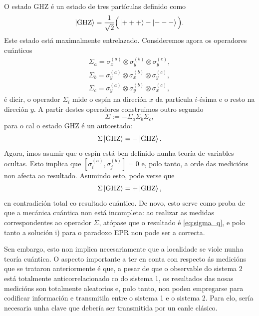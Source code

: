 \documentclass[a4paper,12pt]{article}
\begin{document}
O estado GHZ é un estado de tres partículas definido como
\begin{equation}
	\ket{\mathrm{GHZ}} = \frac{1}{\sqrt{2}} \Big ( \ket{+++} - \ket{---} \Big ).
\end{equation}
\noindent
Este estado está maximalmente entrelazado. Consideremos agora os operadores cuánticos
\begin{equation}
\begin{gathered}
		\Sigma_a = \sigma_x^{(a)} \otimes \sigma_y^{(b)} \otimes \sigma_y^{(c)}, \\
		\Sigma_b = \sigma_y^{(a)} \otimes \sigma_x^{(b)} \otimes \sigma_y^{(c)}, \\
		\Sigma_c = \sigma_y^{(a)} \otimes \sigma_y^{(b)} \otimes \sigma_x^{(c)},
\end{gathered}
\end{equation}
\noindent
é dicir, o operador $\Sigma_i$ mide o espín na direción $x$ da partícula $i$-ésima e o resto na direción $y$. A partir destes operadores construimos outro segundo
\begin{equation}
	\Sigma := -\Sigma_a \Sigma_b \Sigma_c,
\end{equation}
\noindent
para o cal o estado GHZ é un autoestado:
\begin{equation}
	\Sigma \ket{\mathrm{GHZ}} = - \ket{\mathrm{GHZ}}.
	\label{eq:sigma_q}
\end{equation}
Agora, imos asumir que o espín está ben definido nunha teoría de variables ocultas. Esto implica que $[\sigma^{(a)}_i,\sigma^{(b)}_j] = 0$ e, polo tanto, a orde das medicións non afecta ao resultado. Asumindo esto, pode verse que
\begin{equation}
	\Sigma \ket{\mathrm{GHZ}} = + \ket{\mathrm{GHZ}},
\end{equation}
\noindent
en contradición total co resultado cuántico. De novo, esto serve como proba de que a mecánica cuántica non está incompleta: ao realizar as medidas correspondentes ao operador $\Sigma$, atópase que o resultado é \eqref{eq:sigma_q}, e polo tanto a solución i) para o paradoxo EPR non pode ser a correcta.

Sen embargo, esto non implica necesariamente que a localidade se viole nunha teoría cuántica. O aspecto importante a ter en conta con respecto ás medicións que se trataron anteriormente é que, a pesar de que o observable do sistema 2 está totalmente anticorrelacionado co do sistema 1, os resultados das nosas medicións son totalmente aleatorios e, polo tanto, non poden empregarse para codificar información e transmitila entre o sistema 1 e o sistema 2. Para elo, sería necesaria unha clave que debería ser transmitida por un canle clásico.
\end{document}

